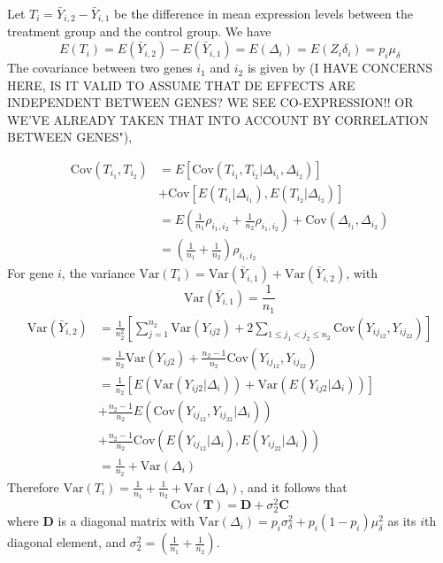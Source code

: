\documentclass[a4,center,fleqn]{NAR}
\begin{document}
		Let $T_i=\bar{Y}_{i,2}-\bar{Y}_{i,1}$ be the difference in mean expression levels between the
		treatment group and the control group. We have 
		\[E(T_i) = E(\bar{Y}_{i,2})-E(\bar{Y}_{i,1}) = E(\Delta_i) = E(Z_i\delta_i) = p_i\mu_{\delta}\]
		The covariance between two genes $i_1$ and $i_2$ is given by (I HAVE CONCERNS HERE, IS IT VALID TO
		ASSUME THAT DE EFFECTS ARE INDEPENDENT BETWEEN GENES?  WE SEE CO-EXPRESSION!! OR WE'VE ALREADY TAKEN
		THAT INTO ACCOUNT BY CORRELATION BETWEEN GENES"), 
		
		\begin{equation}
			\begin{aligned}
				\text{Cov}(T_{i_1}, T_{i_2}) & = E\left[\text{Cov}(T_{i_1}, T_{i_2}|\Delta_{i_1}, \Delta_{i_2})
				\right] \\
				&  + \text{Cov}\left[E(T_{i_1}|\Delta_{i_1}), E(T_{i_2}|\Delta_{i_2})\right] \\
				& = E\left(\frac{1}{n_1}\rho_{i_1,i_2} + \frac{1}{n_2}\rho_{i_1,i_2}\right) +
				\text{Cov}(\Delta_{i_1}, \Delta_{i_2})\\
				& = \left(\frac{1}{n_1} + \frac{1}{n_2}\right)\rho_{i_1,i_2}
			\end{aligned}
		\end{equation}
		For gene $i$, the variance $\text{Var}(T_i) = \text{Var}(\bar{Y}_{i, 1}) + \text{Var}(\bar{Y}_{i,
			2})$, with
		\[\text{Var}(\bar{Y}_{i, 1}) = \frac{1}{n_1}\] 
		\begin{equation}
			\begin{aligned}
				\text{Var}(\bar{Y}_{i, 2}) & = \frac{1}{n_2^2}\left[\sum_{j=1}^{n_2}\text{Var}(Y_{ij2}) +
				2\sum_{1\leq j_1<j_2 \leq n_2} \text{Cov}(Y_{ij_12}, Y_{ij_22})\right] \\
				& = \frac{1}{n_2}\text{Var}(Y_{ij2}) + \frac{n_2-1}{n_2} \text{Cov}(Y_{ij_12}, Y_{ij_22})\\
				& = \frac{1}{n_2}\left[E\left(\text{Var}(Y_{ij2}|\Delta_i)\right) +
				\text{Var}\left(E(Y_{ij2}|\Delta_i)\right)\right] \\ \text{~~~}
				&+\frac{n_2-1}{n_2}E\left(\text{Cov}(Y_{ij_12}, Y_{ij_22}|\Delta_i)\right) \\
				&+\frac{n_2-1}{n_2}\text{Cov}\left(E(Y_{ij_12}|\Delta_i), E(Y_{ij_22}|\Delta_i)\right) \\
				& = \frac{1}{n_2} + \text{Var}(\Delta_i)
			\end{aligned}
		\end{equation}
		Therefore $\text{Var}(T_i)  = \frac{1}{n_1} + \frac{1}{n_2} + \text{Var}(\Delta_i)$, and it follows
		that
		\begin{equation}\label{eq:tvar}
			\text{Cov}(\bm T) =  \bm D + \sigma_2^2\bm C 
		\end{equation}
		where $\bm D$ is a diagonal matrix with $\text{Var}(\Delta_i) =p_i\sigma_{\delta}^2 +
		p_i(1-p_i)\mu_{\delta}^2$ as its $i$th diagonal element, and $\sigma_2^2 = \left(\frac{1}{n_1} +
		\frac{1}{n_2}\right)$.
		
\end{document}
